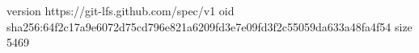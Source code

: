 version https://git-lfs.github.com/spec/v1
oid sha256:64f2c17a9e6072d75cd796e821a6209fd3e7e09fd3f2c55059da633a48fa4f54
size 5469

